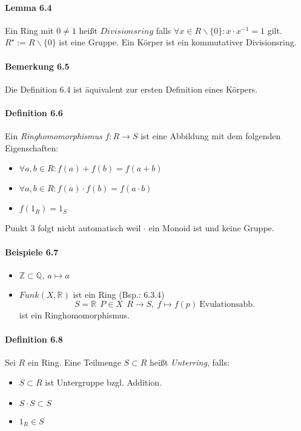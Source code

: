 \documentclass{scrartcl}
\begin{document}
\paragraph{Lemma 6.4}
Ein Ring mit $0 \neq 1$ heißt $Divisionsring$ falls $\forall x \in R \backslash
\{0\}: x \cdot x^{-1} = 1$ gilt.
$R^\star := R \backslash \{ 0 \}$ ist eine Gruppe.
Ein Körper ist ein kommutativer Divisionsring.

\paragraph{Bemerkung 6.5}
Die Definition 6.4 ist äquivalent zur ersten Definition eines Körpers.

\paragraph{Definition 6.6}
Ein \textit{Ringhomomorphismus} $f: R \to S$ ist eine Abbildung mit dem
folgenden Eigenschaften:
\begin{itemize}
\item $\forall a,b \in R: f(a) + f(b) = f(a + b)$
\item $\forall a,b \in R: f(a) \cdot f(b) = f(a \cdot b)$
\item $f(1_R) = 1_S$
\end{itemize}
Punkt 3 folgt nicht automatisch weil $\cdot$ ein Monoid ist und keine Gruppe.

\paragraph{Beispiele 6.7}
\begin{itemize}
\item $\mathbb{Z} \subset \mathbb{Q},~a \mapsto a$
\item $Funk(X, \mathbb{R})$ ist ein Ring (Bsp.: 6.3.4)
  \[
    S = \mathbb{R}~~P \in X~~R \to S,~f \mapsto f(p)~\text{Evulationsabb.}
  \]
  ist ein Ringhomomorphismus.
\end{itemize}

\paragraph{Definition 6.8}
Sei $R$ ein Ring. Eine Teilmenge $S \subset R$ heißt \textit{Unterring}, falls:
\begin{itemize}
\item $S \subset R$ ist Untergruppe bzgl. Addition.
\item $S \cdot S \subset S$
\item $1_R \in S$
\end{itemize}
\end{document}
